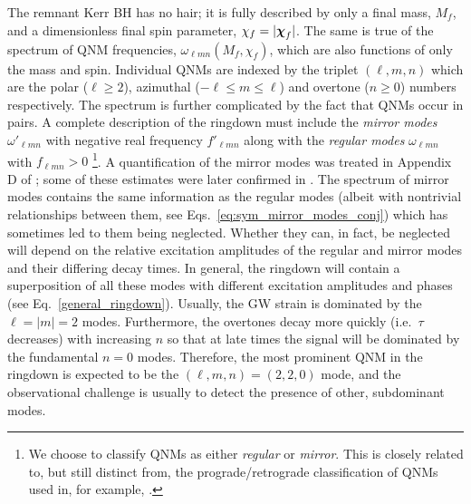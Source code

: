 The remnant Kerr BH has no hair; it is fully described by only a final mass, $M_f$, and a dimensionless final spin parameter, $\chi_f = |\vb*{\chi}_f|$. 
The same is true of the spectrum of QNM frequencies, $\omega_{\ell m n}(M_f, \chi_f)$, which are also functions of only the mass and spin. 
Individual QNMs are indexed by the triplet $(\ell, m, n)$ which are the polar ($\ell\geq2$), azimuthal ($-\ell \leq m \leq \ell$) and overtone ($n \geq 0$) numbers respectively. 
The spectrum is further complicated by the fact that QNMs occur in pairs. 
A complete description of the ringdown must include the \emph{mirror modes} $\omega'_{\ell m n}$ \cite{Berti:2009kk, Berti:2005ys, Dhani:2020nik, London:2014cma} with negative real frequency $f'_{\ell m n}$ along with the \emph{regular modes} $\omega_{\ell m n}$ with $f_{\ell m n}>0$
\footnote{We choose to classify QNMs as either \emph{regular} or \emph{mirror}. This is closely related to, but still distinct from, the prograde/retrograde classification of QNMs used in, for example, \cite{LIGOScientific:2020tif}.}.
A quantification of the mirror modes was treated in Appendix D of \cite{JimenezForteza:2020cve}; some of these estimates were later confirmed in \cite{Dhani:2020nik}.
The spectrum of mirror modes contains the same information as the regular modes (albeit with nontrivial relationships between them, see Eqs.~\ref{eq:sym_mirror_modes_conj}) which has sometimes led to them being neglected. 
Whether they can, in fact, be neglected will depend on the relative excitation amplitudes of the regular and mirror modes and their differing decay times. 
In general, the ringdown will contain a superposition of all these modes with different excitation amplitudes and phases (see Eq.~\ref{general_ringdown}). 
Usually, the GW strain is dominated by the $\ell=|m|=2$ modes. 
Furthermore, the overtones decay more quickly (i.e.\ $\tau$ decreases) with increasing $n$ so that at late times the signal will be dominated by the fundamental $n=0$ modes. 
Therefore, the most prominent QNM in the ringdown is expected to be the $(\ell, m, n)=(2,2,0)$ mode, and the observational challenge is usually to detect the presence of other, subdominant modes.

